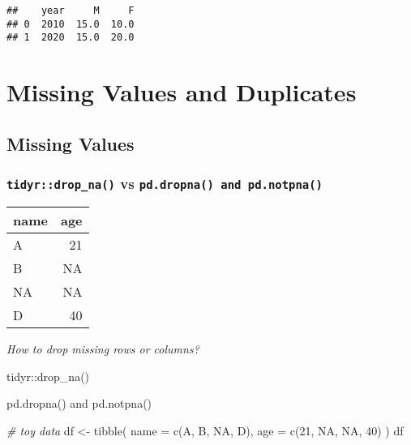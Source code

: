\documentclass[
]{book}
\newenvironment{Shaded}{\begin{snugshade}}{\end{snugshade}}
\newcommand{\AttributeTok}[1]{\textcolor[rgb]{0.77,0.63,0.00}{#1}}
\newcommand{\CommentTok}[1]{\textcolor[rgb]{0.56,0.35,0.01}{\textit{#1}}}
\newcommand{\ConstantTok}[1]{\textcolor[rgb]{0.00,0.00,0.00}{#1}}
\newcommand{\DecValTok}[1]{\textcolor[rgb]{0.00,0.00,0.81}{#1}}
\newcommand{\FunctionTok}[1]{\textcolor[rgb]{0.00,0.00,0.00}{#1}}
\newcommand{\NormalTok}[1]{#1}
\newcommand{\OtherTok}[1]{\textcolor[rgb]{0.56,0.35,0.01}{#1}}
\newcommand{\StringTok}[1]{\textcolor[rgb]{0.31,0.60,0.02}{#1}}
\begin{document}
\begin{verbatim}
##    year     M     F
## 0  2010  15.0  10.0
## 1  2020  15.0  20.0
\end{verbatim}

\hypertarget{missing-values-and-duplicates}{%
\chapter{Missing Values and Duplicates}\label{missing-values-and-duplicates}}

\hypertarget{missing-values}{%
\section{Missing Values}\label{missing-values}}

\hypertarget{tidyrdrop_na-vs-pd.dropna-and-pd.notpna}{%
\subsection{\texorpdfstring{\texttt{tidyr::drop\_na()} vs \texttt{pd.dropna()\ and\ pd.notpna()}}{tidyr::drop\_na() vs pd.dropna() and pd.notpna()}}\label{tidyrdrop_na-vs-pd.dropna-and-pd.notpna}}

\begin{longtable}[]{@{}lr@{}}
\toprule
name & age \\
\midrule
\endhead
A & 21 \\
B & NA \\
NA & NA \\
D & 40 \\
\bottomrule
\end{longtable}

\emph{How to drop missing rows or columns?}

tidyr::drop\_na()

pd.dropna() and pd.notpna()

\begin{Shaded}
\begin{Highlighting}[]
\CommentTok{\# toy data}
\NormalTok{df }\OtherTok{\textless{}{-}} \FunctionTok{tibble}\NormalTok{(}
  \AttributeTok{name =} \FunctionTok{c}\NormalTok{(}\StringTok{\textquotesingle{}A\textquotesingle{}}\NormalTok{, }\StringTok{\textquotesingle{}B\textquotesingle{}}\NormalTok{,}
           \ConstantTok{NA}\NormalTok{, }\StringTok{\textquotesingle{}D\textquotesingle{}}\NormalTok{),}
  \AttributeTok{age  =}  \FunctionTok{c}\NormalTok{(}\DecValTok{21}\NormalTok{, }\ConstantTok{NA}\NormalTok{,}
           \ConstantTok{NA}\NormalTok{, }\DecValTok{40}\NormalTok{)}
\NormalTok{)}
\NormalTok{df}
\end{Highlighting}
\end{Shaded}
\end{document}
